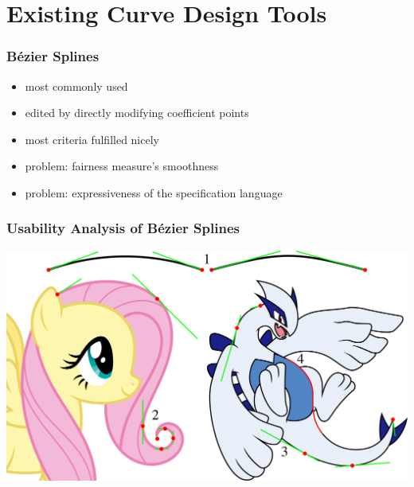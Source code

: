 \documentclass{beamer}
\begin{document}
	\section{Existing Curve Design Tools}
		\begin{frame}
			\frametitle{Bézier Splines}
			\begin{itemize}
				\item most commonly used
				\item edited by directly modifying coefficient points
				\item most criteria fulfilled nicely
				\item problem: fairness measure's smoothness 
				\item problem: expressiveness of the specification language
			\end{itemize}
		\end{frame}
		
		\begin{frame}
			\frametitle{Usability Analysis of Bézier Splines}
			\begin{centering}
				\includegraphics[width=\textwidth]{../resources/usability_bezier.pdf}\\
			\end{centering}
		\end{frame}
		
\end{document}
